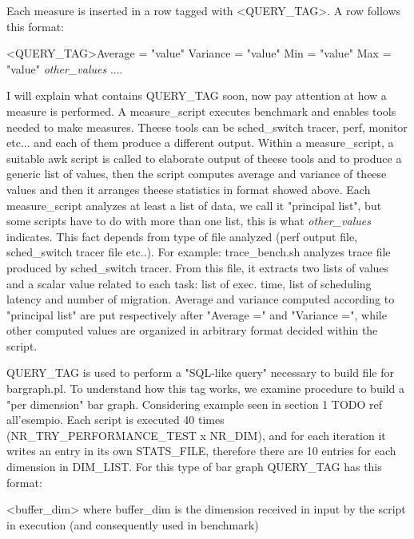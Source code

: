 \documentclass[a4paper,10pt]{article}
\begin{document}
\begin{multicols}{2}
Each measure is inserted in a row tagged with <QUERY\_TAG>. A row follows this format:

<QUERY\_TAG>Average = "value" Variance = "value" Min = "value" Max = "value" \textit{other_values}
....

I will explain what contains QUERY\_TAG soon, now pay attention at how a measure is performed.
A measure\_script executes benchmark and enables tools needed to make measures.
Theese tools can be sched_switch tracer, perf, monitor etc... and each of them produce a different output. Within a measure\_script,
a suitable awk script is called to elaborate output of theese tools and to produce a generic list of values, then the script computes 
average and variance of theese values and then it arranges theese statistics in format showed above. Each measure\_script analyzes 
at least a list of data, we call it "principal list", but some scripts have to do with more than one list, this is 
what \textit{other_values} indicates. This fact depends from type of file analyzed (perf output file, sched_switch tracer file etc..). 
For example: trace_bench.sh analyzes trace file produced by sched_switch tracer. From this file, it extracts two lists of values and a 
scalar value related to each task: list of exec. time, list of scheduling latency and number of migration.
Average and variance computed according to "principal list" are put respectively after "Average =" and "Variance =", while other computed values are
organized in arbitrary format decided within the script. 

QUERY\_TAG is used to perform a "SQL-like query" necessary to build file for bargraph.pl. To understand how this tag works, we examine
procedure to build a "per dimension" bar graph. Considering example seen in section 1 TODO ref all'esempio.
Each script is executed 40 times (NR\_TRY\_PERFORMANCE\_TEST x NR\_DIM), and for each iteration
it writes an entry in its own STATS\_FILE, therefore there are 10 entries for each
dimension in DIM\_LIST. For this type of bar graph QUERY\_TAG has this format:

<buffer\_dim> where buffer\_dim is the dimension received in input by the script in execution
(and consequently used in benchmark)


\end{multicols}
\end{document}
